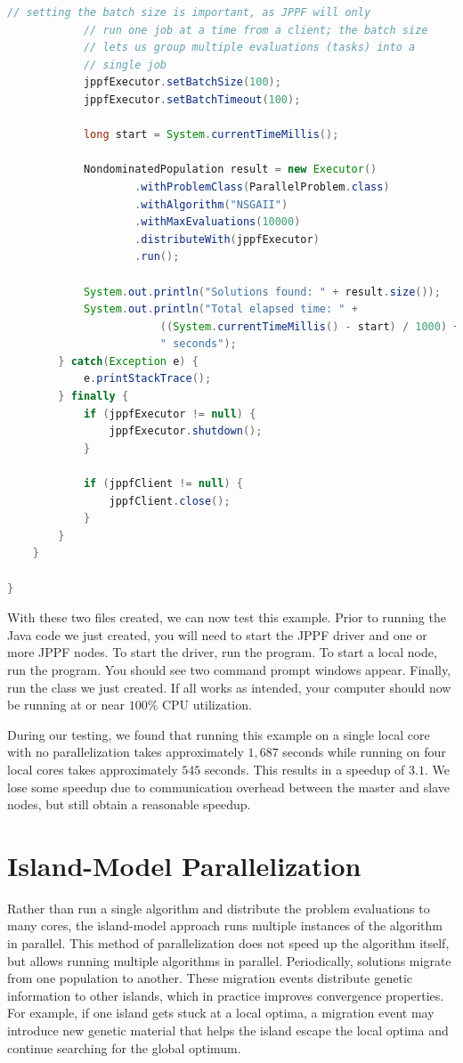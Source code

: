 {\begin{lstlisting}[language=Java]
			// setting the batch size is important, as JPPF will only
			// run one job at a time from a client; the batch size
			// lets us group multiple evaluations (tasks) into a
			// single job
			jppfExecutor.setBatchSize(100);
			jppfExecutor.setBatchTimeout(100);
			
			long start = System.currentTimeMillis();

			NondominatedPopulation result = new Executor()
					.withProblemClass(ParallelProblem.class)
					.withAlgorithm("NSGAII")
					.withMaxEvaluations(10000)
					.distributeWith(jppfExecutor)
					.run();
			
			System.out.println("Solutions found: " + result.size());
			System.out.println("Total elapsed time: " + 
						((System.currentTimeMillis() - start) / 1000) +
						" seconds");
		} catch(Exception e) {
			e.printStackTrace();
		} finally {
			if (jppfExecutor != null) {
				jppfExecutor.shutdown();
			}

			if (jppfClient != null) {
				jppfClient.close();
			}
		}
	}
	
}
\end{lstlisting}

With these two files created, we can now test this example.  Prior to running the Java code we just created, you will need to start the JPPF driver and one or more JPPF nodes.  To start the driver, run the  program.  To start a local node, run the  program.  You should see two command prompt windows appear.  Finally, run the  class we just created.  If all works as intended, your computer should now be running at or near $100\%$ CPU utilization.

During our testing, we found that running this example on a single local core with no parallelization takes approximately $1,687$ seconds while running on four local cores takes approximately $545$ seconds.  This results in a speedup of $3.1$.  We lose some speedup due to communication overhead between the master and slave nodes, but still obtain a reasonable speedup.

\section{Island-Model Parallelization}

Rather than run a single algorithm and distribute the problem evaluations to many cores, the island-model approach runs multiple instances of the algorithm in parallel.  This method of parallelization does not speed up the algorithm itself, but allows running multiple algorithms in parallel.  Periodically, solutions migrate from one population to another.  These migration events distribute genetic information to other islands, which in practice improves convergence properties.  For example, if one island gets stuck at a local optima, a migration event may introduce new genetic material that helps the island escape the local optima and continue searching for the global optimum.

}
